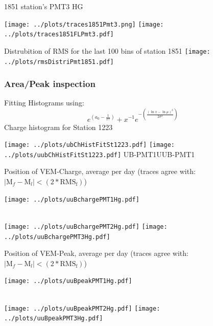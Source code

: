 \documentclass[aspectratio=169]{beamer}
\begin{document}
\begin{frame}
	1851 station's PMT3 HG

  \centering
	\texttt{[image: ../plots/traces1851Pmt3.png]}
	\texttt{[image: ../plots/traces1851FLPmt3.pdf]}
\end{frame}


\begin{frame}
	Distrubition of RMS for the last 100 bins of station 1851
	\centering
	\texttt{[image: ../plots/rmsDistriPmt1851.pdf]}
\end{frame}


\begin{frame}
	\frametitle{Area/Peak inspection}
	Fitting Histograms using:
	\begin{displaymath}
		e^{\left( a_0-\frac{1}{x\tau}\right) } + x^{-1}e^{ -\left(\frac{(\ln x - \ln\mu)^2}{2\sigma^2}\right) }
	\end{displaymath}
	Charge histogram for Station 1223
	\vspace{0.5cm}

  \centering
	\texttt{[image: ../plots/ubChHistFitSt1223.pdf]}
	\texttt{[image: ../plots/uubChHistFitSt1223.pdf]}
	UB-PMT1\qquad\qquad\qquad\qquad\qquad\qquad\qquad\qquad UUB-PMT1
\end{frame}


\begin{frame}
	Position of VEM-Charge, average per day (traces agree with: $\mid \mathrm{M}_f - \mathrm{M}_l \mid < \left( 2*\mathrm{RMS_f} \right) $)

  \centering
	\texttt{[image: ../plots/uuBchargePMT1Hg.pdf]}\quad%
	\begin{minipage}[b][0.4\textheight][c]
		{.45\linewidth}
	\end{minipage}\\[1em]
	\texttt{[image: ../plots/uuBchargePMT2Hg.pdf]}\quad%
	\texttt{[image: ../plots/uuBchargePMT3Hg.pdf]}
\end{frame}


\begin{frame}
	Position of VEM-Peak, average per day (traces agree with: $\mid \mathrm{M}_f - \mathrm{M}_l \mid < \left( 2*\mathrm{RMS_f} \right) $)

  \centering
	\texttt{[image: ../plots/uuBpeakPMT1Hg.pdf]}\quad%
	\begin{minipage}[b][0.4\textheight][c]
		{.45\linewidth}
	\end{minipage}\\[1em]
	\texttt{[image: ../plots/uuBpeakPMT2Hg.pdf]}\quad%
	\texttt{[image: ../plots/uuBpeakPMT3Hg.pdf]}
\end{frame}
\end{document}
